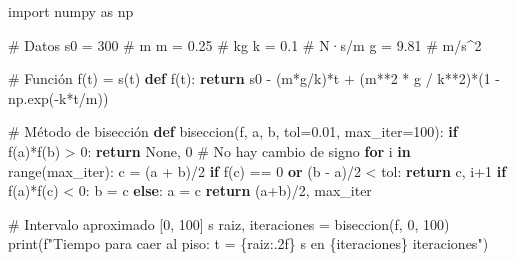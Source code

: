 \documentclass[
  english,
  letterpaper,
  DIV=11,
  numbers=noendperiod]{scrartcl}
\newenvironment{Shaded}{\begin{snugshade}}{\end{snugshade}}
\newcommand{\BuiltInTok}[1]{\textcolor[rgb]{0.00,0.23,0.31}{#1}}
\newcommand{\CommentTok}[1]{\textcolor[rgb]{0.37,0.37,0.37}{#1}}
\newcommand{\ControlFlowTok}[1]{\textcolor[rgb]{0.00,0.23,0.31}{\textbf{#1}}}
\newcommand{\DecValTok}[1]{\textcolor[rgb]{0.68,0.00,0.00}{#1}}
\newcommand{\FloatTok}[1]{\textcolor[rgb]{0.68,0.00,0.00}{#1}}
\newcommand{\ImportTok}[1]{\textcolor[rgb]{0.00,0.46,0.62}{#1}}
\newcommand{\KeywordTok}[1]{\textcolor[rgb]{0.00,0.23,0.31}{\textbf{#1}}}
\newcommand{\NormalTok}[1]{\textcolor[rgb]{0.00,0.23,0.31}{#1}}
\newcommand{\OperatorTok}[1]{\textcolor[rgb]{0.37,0.37,0.37}{#1}}
\newcommand{\SpecialCharTok}[1]{\textcolor[rgb]{0.37,0.37,0.37}{#1}}
\newcommand{\SpecialStringTok}[1]{\textcolor[rgb]{0.13,0.47,0.30}{#1}}
\newcommand{\VariableTok}[1]{\textcolor[rgb]{0.07,0.07,0.07}{#1}}
\begin{document}
\begin{Shaded}
\begin{Highlighting}[]
\ImportTok{import}\NormalTok{ numpy }\ImportTok{as}\NormalTok{ np}

\CommentTok{\# Datos}
\NormalTok{s0 }\OperatorTok{=} \DecValTok{300}   \CommentTok{\# m}
\NormalTok{m }\OperatorTok{=} \FloatTok{0.25}   \CommentTok{\# kg}
\NormalTok{k }\OperatorTok{=} \FloatTok{0.1}    \CommentTok{\# N·s/m}
\NormalTok{g }\OperatorTok{=} \FloatTok{9.81}   \CommentTok{\# m/s\^{}2}

\CommentTok{\# Función f(t) = s(t)}
\KeywordTok{def}\NormalTok{ f(t):}
    \ControlFlowTok{return}\NormalTok{ s0 }\OperatorTok{{-}}\NormalTok{ (m}\OperatorTok{*}\NormalTok{g}\OperatorTok{/}\NormalTok{k)}\OperatorTok{*}\NormalTok{t }\OperatorTok{+}\NormalTok{ (m}\OperatorTok{**}\DecValTok{2} \OperatorTok{*}\NormalTok{ g }\OperatorTok{/}\NormalTok{ k}\OperatorTok{**}\DecValTok{2}\NormalTok{)}\OperatorTok{*}\NormalTok{(}\DecValTok{1} \OperatorTok{{-}}\NormalTok{ np.exp(}\OperatorTok{{-}}\NormalTok{k}\OperatorTok{*}\NormalTok{t}\OperatorTok{/}\NormalTok{m))}

\CommentTok{\# Método de bisección}
\KeywordTok{def}\NormalTok{ biseccion(f, a, b, tol}\OperatorTok{=}\FloatTok{0.01}\NormalTok{, max\_iter}\OperatorTok{=}\DecValTok{100}\NormalTok{):}
    \ControlFlowTok{if}\NormalTok{ f(a)}\OperatorTok{*}\NormalTok{f(b) }\OperatorTok{\textgreater{}} \DecValTok{0}\NormalTok{:}
        \ControlFlowTok{return} \VariableTok{None}\NormalTok{, }\DecValTok{0}  \CommentTok{\# No hay cambio de signo}
    \ControlFlowTok{for}\NormalTok{ i }\KeywordTok{in} \BuiltInTok{range}\NormalTok{(max\_iter):}
\NormalTok{        c }\OperatorTok{=}\NormalTok{ (a }\OperatorTok{+}\NormalTok{ b)}\OperatorTok{/}\DecValTok{2}
        \ControlFlowTok{if}\NormalTok{ f(c) }\OperatorTok{==} \DecValTok{0} \KeywordTok{or}\NormalTok{ (b }\OperatorTok{{-}}\NormalTok{ a)}\OperatorTok{/}\DecValTok{2} \OperatorTok{\textless{}}\NormalTok{ tol:}
            \ControlFlowTok{return}\NormalTok{ c, i}\OperatorTok{+}\DecValTok{1}
        \ControlFlowTok{if}\NormalTok{ f(a)}\OperatorTok{*}\NormalTok{f(c) }\OperatorTok{\textless{}} \DecValTok{0}\NormalTok{:}
\NormalTok{            b }\OperatorTok{=}\NormalTok{ c}
        \ControlFlowTok{else}\NormalTok{:}
\NormalTok{            a }\OperatorTok{=}\NormalTok{ c}
    \ControlFlowTok{return}\NormalTok{ (a}\OperatorTok{+}\NormalTok{b)}\OperatorTok{/}\DecValTok{2}\NormalTok{, max\_iter}

\CommentTok{\# Intervalo aproximado [0, 100] s}
\NormalTok{raiz, iteraciones }\OperatorTok{=}\NormalTok{ biseccion(f, }\DecValTok{0}\NormalTok{, }\DecValTok{100}\NormalTok{)}
\BuiltInTok{print}\NormalTok{(}\SpecialStringTok{f"Tiempo para caer al piso: t = }\SpecialCharTok{\{}\NormalTok{raiz}\SpecialCharTok{:.2f\}}\SpecialStringTok{ s en }\SpecialCharTok{\{}\NormalTok{iteraciones}\SpecialCharTok{\}}\SpecialStringTok{ iteraciones"}\NormalTok{)}
\end{Highlighting}
\end{Shaded}
\end{document}
